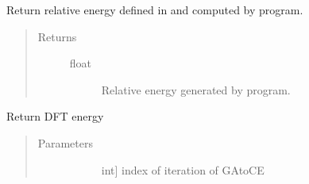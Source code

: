 \documentclass[letterpaper,10pt,english]{sphinxmanual}
\begin{document}
\begin{fulllineitems}
\begin{fulllineitems}
\begin{quote}
\begin{description}
\begin{description}
\end{description}

\end{description}\end{quote}

\end{fulllineitems}


\begin{fulllineitems}
\label{\detokenize{pygace:pygace.general_gace.GeneralEleIndv.ce_energy_corrdump}}
\sphinxAtStartPar
Return relative energy defined in  and computed by 
program.
\begin{quote}\begin{description}
\item[{Returns}] \leavevmode\begin{description}
\item[{float}] \leavevmode
\sphinxAtStartPar
Relative energy generated by  program.

\end{description}

\end{description}\end{quote}

\end{fulllineitems}


\begin{fulllineitems}
\label{\detokenize{pygace:pygace.general_gace.GeneralEleIndv.dft_energy}}
\sphinxAtStartPar
Return DFT energy
\begin{quote}\begin{description}
\item[{Parameters}] \leavevmode\begin{description}
\item[{}] \leavevmode{[}int{]}
\sphinxAtStartPar
index of iteration of GA\sphinxhyphen{}to\sphinxhyphen{}CE


\end{description}
\end{description}
\end{quote}
\end{fulllineitems}
\end{fulllineitems}
\end{document}
